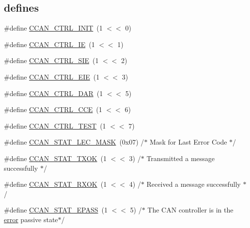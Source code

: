\subsection*{\textquotesingle{}defines\textquotesingle{}}
\begin{DoxyCompactItemize}
\item 
\#define \hyperlink{group___c_c_a_n__18_x_x__43_x_x_ga67343de48aecd561cc46691a58fe1aa2}{C\+C\+A\+N\+\_\+\+C\+T\+R\+L\+\_\+\+I\+N\+IT}~(1 $<$$<$ 0)
\item 
\#define \hyperlink{group___c_c_a_n__18_x_x__43_x_x_gaa4d20674c2eed8d630afd662d12fecc8}{C\+C\+A\+N\+\_\+\+C\+T\+R\+L\+\_\+\+IE}~(1 $<$$<$ 1)
\item 
\#define \hyperlink{group___c_c_a_n__18_x_x__43_x_x_gaa0de0b1c4b72f922d1e69d3849830928}{C\+C\+A\+N\+\_\+\+C\+T\+R\+L\+\_\+\+S\+IE}~(1 $<$$<$ 2)
\item 
\#define \hyperlink{group___c_c_a_n__18_x_x__43_x_x_ga7227d00cb5d6ab0055f183f272ee647c}{C\+C\+A\+N\+\_\+\+C\+T\+R\+L\+\_\+\+E\+IE}~(1 $<$$<$ 3)
\item 
\#define \hyperlink{group___c_c_a_n__18_x_x__43_x_x_ga372744b6be07f3fea89ada4ea3de4d9d}{C\+C\+A\+N\+\_\+\+C\+T\+R\+L\+\_\+\+D\+AR}~(1 $<$$<$ 5)
\item 
\#define \hyperlink{group___c_c_a_n__18_x_x__43_x_x_gaa65884720eb6b15b0acbff51e6be75b6}{C\+C\+A\+N\+\_\+\+C\+T\+R\+L\+\_\+\+C\+CE}~(1 $<$$<$ 6)
\item 
\#define \hyperlink{group___c_c_a_n__18_x_x__43_x_x_ga24b5503f3d90fa98a3ecb0e8f4e23bfa}{C\+C\+A\+N\+\_\+\+C\+T\+R\+L\+\_\+\+T\+E\+ST}~(1 $<$$<$ 7)
\item 
\#define \hyperlink{group___c_c_a_n__18_x_x__43_x_x_ga8ba9703a5b17eaefa9c4840455774a34}{C\+C\+A\+N\+\_\+\+S\+T\+A\+T\+\_\+\+L\+E\+C\+\_\+\+M\+A\+SK}~(0x07)		/$\ast$ Mask for Last Error Code $\ast$/
\item 
\#define \hyperlink{group___c_c_a_n__18_x_x__43_x_x_ga89b5bd7c2e8a0593d1d4b325e1d04a2f}{C\+C\+A\+N\+\_\+\+S\+T\+A\+T\+\_\+\+T\+X\+OK}~(1 $<$$<$ 3)	/$\ast$ Transmitted a message successfully $\ast$/
\item 
\#define \hyperlink{group___c_c_a_n__18_x_x__43_x_x_gad3b3105c74981a041f4d3515e989bfbd}{C\+C\+A\+N\+\_\+\+S\+T\+A\+T\+\_\+\+R\+X\+OK}~(1 $<$$<$ 4)	/$\ast$ Received a message successfully $\ast$/
\item 
\#define \hyperlink{group___c_c_a_n__18_x_x__43_x_x_ga86acb18cb4751429d866c9fb8f119d44}{C\+C\+A\+N\+\_\+\+S\+T\+A\+T\+\_\+\+E\+P\+A\+SS}~(1 $<$$<$ 5)	/$\ast$ The C\+AN controller is in the \hyperlink{group__utils_gaad9796c174f7ef5d226cd169f2520fd5}{error} passive state$\ast$/

\end{DoxyCompactItemize}

